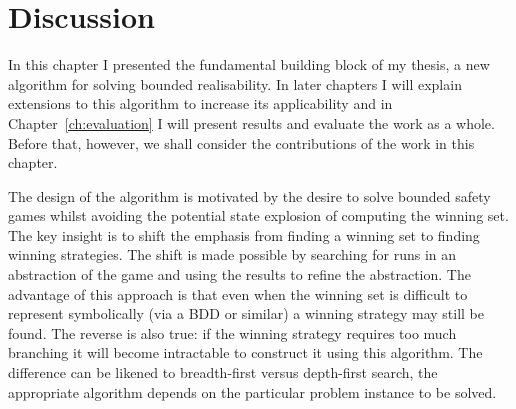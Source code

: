 \section{Discussion}

In this chapter I presented the fundamental building block of my thesis, a new algorithm for solving bounded realisability. In later chapters I will explain extensions to this algorithm to increase its applicability and in Chapter~\ref{ch:evaluation} I will present results and evaluate the work as a whole. Before that, however, we shall consider the contributions of the work in this chapter.

The design of the algorithm is motivated by the desire to solve bounded safety games whilst avoiding the potential state explosion of computing the winning set. The key insight is to shift the emphasis from finding a winning set to finding winning strategies. The shift is made possible by searching for runs in an abstraction of the game and using the results to refine the abstraction. The advantage of this approach is that even when the winning set is difficult to represent symbolically (via a BDD or similar) a winning strategy may still be found. The reverse is also true: if the winning strategy requires too much branching it will become intractable to construct it using this algorithm. The difference can be likened to breadth-first versus depth-first search, the appropriate algorithm depends on the particular problem instance to be solved.
